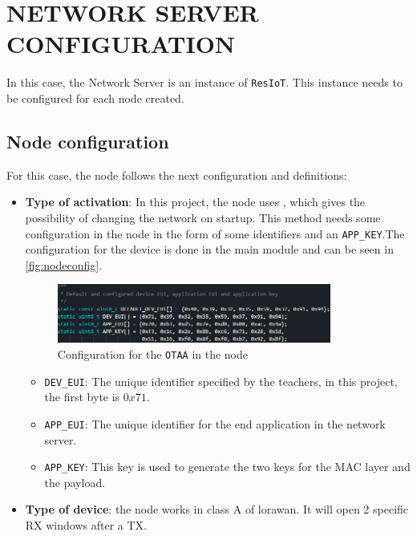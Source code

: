 \section{NETWORK SERVER CONFIGURATION}

In this case, the Network Server is an instance of \texttt{ResIoT}\cite{ResIOTLoRaWANNetwork}. This instance needs to be configured for each node created.

\subsection{Node configuration}

For this case, the node follows the next configuration and definitions:
\begin{itemize}
    \item \textbf{Type of activation}: In this project, the node uses , which gives the possibility of changing the network on startup. 
    This method needs some configuration in the node in the form of some identifiers and an \texttt{APP\_KEY}.The configuration for the device is done in 
    the main module and can be seen in \autoref{fig:nodeconfig}.
    \begin{figure}[H]
        \centering
        \includegraphics[width=0.85\textwidth]{images/6/Node_config.png}
        \caption{Configuration for the \texttt{OTAA} in the node}
        \label{fig:nodeconfig}
    \end{figure}
    \begin{itemize}
        \item \texttt{DEV\_EUI}: The unique identifier specified by the teachers, in this project, the first byte is $0x71$.
        \item \texttt{APP\_EUI}: The unique identifier for the end application in the network server.
        \item \texttt{APP\_KEY}: This key is used to generate the two keys for the MAC layer and the payload.
    \end{itemize}
    \item \textbf{Type of device}: the node works in class A of \acrshort{lorawan}. It will open 2 specific RX windows after a TX.
\end{itemize}


